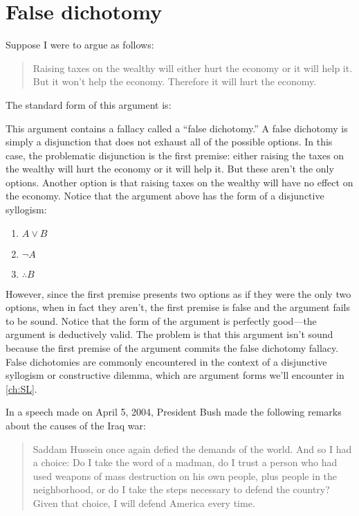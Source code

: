 \section{False dichotomy}\label{sec:falsedichotomy}

Suppose I were to argue as follows:
\begin{quote}
Raising taxes on the wealthy will either hurt the economy or it will help it. But it won't help the economy. Therefore it will hurt the economy.
\end{quote}

The standard form of this argument is:
\begin{kormanize}
\end{kormanize}

This argument contains a fallacy called a ``false dichotomy.'' A false dichotomy is simply a disjunction that does not exhaust all of the possible options. In this case, the problematic disjunction is the first premise: either raising the taxes on the wealthy will hurt the economy or it will help it. But these aren't the only options. Another option is that raising taxes on the wealthy will have no effect on the economy. Notice that the argument above has the form of a disjunctive syllogism:
\begin{enumerate}
\item $A \lor B$
\item $\lnot A$
\item $\therefore B$
\end{enumerate}
However, since the first premise presents two options as if they were the only two options, when in fact they aren't, the first premise is false and the argument fails to be sound. Notice that the form of the argument is perfectly good---the argument is deductively valid. The problem is that this argument isn't sound because the first premise of the argument commits the false dichotomy fallacy.  False dichotomies are commonly encountered in the context of a disjunctive syllogism or constructive dilemma, which are argument forms we'll encounter in \ref{ch:SL}.

In a speech made on April 5, 2004, President Bush made the following remarks about the causes of the Iraq war:
\begin{quote}
Saddam Hussein once again defied the demands of the world. And so I had a choice: Do I take the word of a madman, do I trust a person who had used weapons of mass destruction on his own people, plus people in the neighborhood, or do I take the steps necessary to defend the country? Given that choice, I will defend America every time.
\end{quote}

